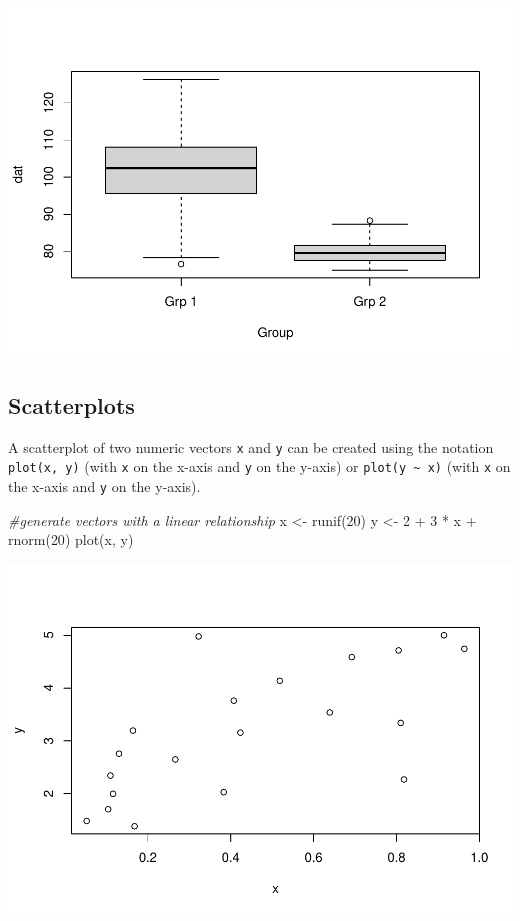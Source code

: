 \documentclass[
]{article}
\newenvironment{Shaded}{\begin{snugshade}}{\end{snugshade}}
\newcommand{\CommentTok}[1]{\textcolor[rgb]{0.56,0.35,0.01}{\textit{#1}}}
\newcommand{\DecValTok}[1]{\textcolor[rgb]{0.00,0.00,0.81}{#1}}
\newcommand{\FunctionTok}[1]{\textcolor[rgb]{0.00,0.00,0.00}{#1}}
\newcommand{\NormalTok}[1]{#1}
\newcommand{\OtherTok}[1]{\textcolor[rgb]{0.56,0.35,0.01}{#1}}
\newcommand{\SpecialCharTok}[1]{\textcolor[rgb]{0.00,0.00,0.00}{#1}}
\begin{document}
\includegraphics{crash-course-in-r_files/figure-latex/unnamed-chunk-19-1.pdf}

\hypertarget{scatterplots}{%
\subsection{Scatterplots}\label{scatterplots}}

A scatterplot of two numeric vectors \texttt{x} and \texttt{y} can be
created using the notation \texttt{plot(x,\ y)} (with \texttt{x} on the
x-axis and \texttt{y} on the y-axis) or
\texttt{plot(y\ \textasciitilde{}\ x)} (with \texttt{x} on the x-axis
and \texttt{y} on the y-axis).

\begin{Shaded}
\begin{Highlighting}[]
\CommentTok{\#generate vectors with a linear relationship}
\NormalTok{x }\OtherTok{\textless{}{-}} \FunctionTok{runif}\NormalTok{(}\DecValTok{20}\NormalTok{)}
\NormalTok{y }\OtherTok{\textless{}{-}} \DecValTok{2} \SpecialCharTok{+} \DecValTok{3} \SpecialCharTok{*}\NormalTok{ x }\SpecialCharTok{+} \FunctionTok{rnorm}\NormalTok{(}\DecValTok{20}\NormalTok{)}
\FunctionTok{plot}\NormalTok{(x, y)}
\end{Highlighting}
\end{Shaded}

\includegraphics{crash-course-in-r_files/figure-latex/unnamed-chunk-20-1.pdf}
\end{document}

